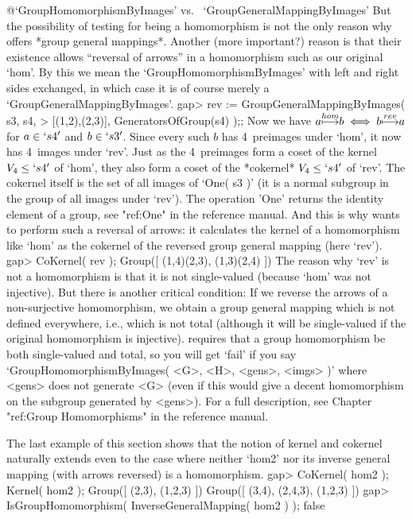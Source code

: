 %
{@\noexpand `GroupHomomorphismByImages' vs.\ %
\noexpand `GroupGeneralMappingByImages'}
But the  possibility of testing for being  a homomorphism is not the only
reason  why    {\GAP} offers  *group   general  mappings*.  Another (more
important?) reason is that  their existence allows ``reversal of arrows''
in a  homomorphism such   as  our original  `hom'. By   this we mean  the
`GroupHomomorphismByImages' with left and right sides exchanged, in which
case it is of course merely a `GroupGeneralMappingByImages'.
\beginexample
gap> rev := GroupGeneralMappingByImages( s3, s4,
>           [(1,2),(2,3)], GeneratorsOfGroup(s4) );;
\endexample
Now we have 
$a {\buildrel hom\over\longmapsto} b \iff b {\buildrel rev\over\longmapsto} a$
for $a\in `s4'$ and $b\in `s3'$. Since every
such $b$ has 4~preimages under `hom', it now has 4~images under `rev'.
Just as the 4~preimages form a coset of the kernel $V_4\le `s4'$ of
`hom', they also form a coset of the *cokernel* $V_4\le `s4'$ of
`rev'.  The cokernel itself is the set of all images of `One( s3 )'
(it is a normal subgroup in the group of all images under `rev'). The
operation 'One' returns the identity element of a group, see "ref:One"
in the reference manual.  And this is why {\GAP} wants to perform such
a reversal of arrows: it calculates the kernel of a homomorphism like
`hom' as the cokernel of the reversed group general mapping (here `rev').
\beginexample
gap> CoKernel( rev );
Group([ (1,4)(2,3), (1,3)(2,4) ])
\endexample
{}
The  reason  why  `rev'   is not  a    homomorphism is  that   it is  not
single-valued  (because `hom' was   not injective). But there  is another
critical  condition: If   we   reverse the arrows   of  a  non-surjective
homomorphism,  we  obtain a group  general mapping  which  is not defined
everywhere, i.e.,  which is not total  (although it will be single-valued
if the original homomorphism is  injective). {\GAP} requires that a group
homomorphism be  both  single-valued  and total,
so you will get `fail' if you say
`GroupHomomorphismByImages( <G>, <H>, <gens>, <imgs> )' where <gens> does
not generate <G> (even if this would give a decent homomorphism on the
subgroup generated by <gens>).  For a full description,
see Chapter "ref:Group Homomorphisms" in the reference manual.

The last  example of this   section shows that  the  notion of kernel and
cokernel naturally extends even to the case  where neither `hom2' nor its
inverse general mapping (with arrows reversed) is a homomorphism.
\beginexample
gap> CoKernel( hom2 );  Kernel( hom2 );
Group([ (2,3), (1,2,3) ])
Group([ (3,4), (2,4,3), (1,2,3) ])
gap> IsGroupHomomorphism( InverseGeneralMapping( hom2 ) );
false
\endexample

